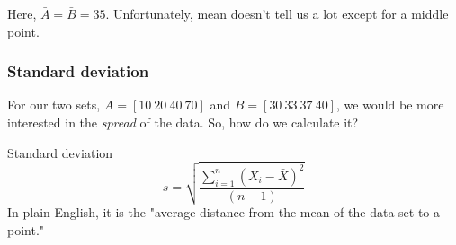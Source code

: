 \documentclass{beamer}
\begin{document}
\begin{frame}[fragile]
\begin{center}
\begin{tikzpicture}
            \end{tikzpicture}
        \end{center}
        Here, $\bar{{A}} = \bar{{B}} = 35$. Unfortunately, mean doesn't tell us a lot except for a middle point.
    \end{frame}

    \begin{frame}
        \frametitle{Standard deviation}
        For our two sets, $A = \left[ 10\: 20\: 40\: 70 \right]$ and $B = \left[ 30\: 33\: 37\: 40 \right]$, we would be more interested in the \emph{spread} of the data.
        \bigskip
        So, how do we calculate it?
        \begin{center}    
            \begin{block}{Standard deviation}
                \begin{equation}    %
                    s = \sqrt{\frac{\sum_{i=1}^n (X_i - \bar{X})^2}{(n-1)}}
                \end{equation}
                In plain English, it is the "average distance from the mean of the data set to a point."
            \end{block}
        \end{center}
        
    \end{frame}
\end{document}
